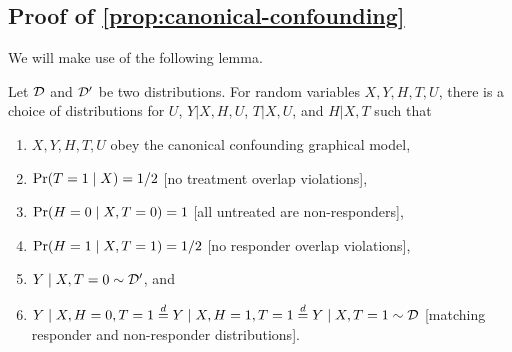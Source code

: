 
\subsection{Proof of \cref{prop:canonical-confounding}}

We will make use of the following lemma.

\begin{lemma}
\label{lem:general-latent-confounding}
Let $\mathcal{D}$ and $\mathcal{D}'$ be two distributions. For random variables $X, Y, H, T, U$, there is a choice of distributions for $U$, $Y|X,H,U$, $T|X,U$, and $H|X,T$ such that
\begin{enumerate}
\item $X, Y, H, T, U$ obey the canonical confounding graphical model,
\item $\textnormal{Pr}(T=1 \mid X) = 1/2$ [no treatment overlap violations],
\item $\textnormal{Pr}(H=0 \mid X, T=0) = 1$ [all untreated are non-responders], 
\item $\textnormal{Pr}(H=1 \mid X, T=1) = 1/2$ [no responder overlap violations], 
\item $Y \mid X, T=0 \sim \mathcal{D}'$, and
\item $Y \mid X, H=0, T=1 \overset{d}{=} Y \mid X, H=1, T=1 \overset{d}{=} Y \mid X, T=1 \sim \mathcal{D}$ [matching responder and non-responder distributions].
\end{enumerate}
\end{lemma}

